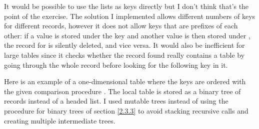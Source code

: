\begin{exe}[3.25]
    It would be possible to use the lists as keys directly but I don’t think 
    that’s the point of the exercise. The solution I implemented allows 
    different numbers of keys for different records, however it does not allow 
    keys that are prefixes of each other: if a value is stored under the key
     and another value is then stored under , the 
    record for  is silently deleted, and vice versa. It would 
    also be inefficient for large tables since it checks whether the record 
    found really contains a table by going through the whole record before 
    looking for the following key in it.
\end{exe}

\begin{exe}[3.26]
    Here is an example of a one-dimensional table where the keys are ordered 
    with the given comparison procedure . The local table is stored as 
    a binary tree of records instead of a headed list. I used mutable trees 
    instead of using the  procedure for binary trees of 
    section \ref{2.3.3} to avoid stacking recursive calls and creating multiple 
    intermediate trees.
\end{exe}

